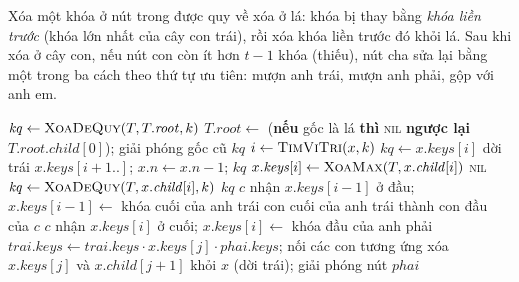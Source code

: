 Xóa một khóa ở nút trong được quy về xóa ở lá: khóa bị thay bằng \emph{khóa liền trước} (khóa lớn nhất của cây
con trái), rồi xóa khóa liền trước đó khỏi lá. Sau khi xóa ở cây con, nếu nút con còn ít hơn $t-1$ khóa (thiếu),
nút cha sửa lại bằng một trong ba cách theo thứ tự ưu tiên: mượn anh trái, mượn anh phải, gộp với anh em.

\begin{algorithm}[htbp]
\caption{Xóa mặt hàng () với mượn và gộp nút}\label{alg:xoa}
\begin{algorithmic}[1]
  \State $\mathit{kq} \gets \Call{XoaDeQuy}{T, T.\mathit{root}, k}$
   
    \State $T.\mathit{root} \gets$ (\textbf{nếu} gốc là lá \textbf{thì} \textsc{nil} \textbf{ngược lại} $T.\mathit{root}.\mathit{child}[0]$); giải phóng gốc cũ
  \EndIf
  \State \Return $\mathit{kq}$ 
\EndFunction
\Statex
{}
  \State $i \gets \Call{TimViTri}{x, k}$
    \State $\mathit{kq} \gets x.\mathit{keys}[i]$
     \State dời trái $x.\mathit{keys}[i+1..]$; $x.n \gets x.n - 1$; \Return $\mathit{kq}$ \EndIf
    \State $x.\mathit{keys}[i] \gets \Call{XoaMax}{T, x.\mathit{child}[i]}$ 
   \State \Return \textsc{nil} 
  \Else \State $\mathit{kq} \gets \Call{XoaDeQuy}{T, x.\mathit{child}[i], k}$
  \EndIf
   \State {} \EndIf
  \State \Return $\mathit{kq}$
\EndFunction
\Statex
{} 
   
    \State $c$ nhận $x.\mathit{keys}[i-1]$ ở đầu; $x.\mathit{keys}[i-1] \gets$ khóa cuối của anh trái
    \State con cuối của anh trái thành con đầu của $c$
   
    \State $c$ nhận $x.\mathit{keys}[i]$ ở cuối; $x.\mathit{keys}[i] \gets$ khóa đầu của anh phải
   \State {} \Else \State {} \EndIf
\EndProcedure
\Statex
{} 
  \State $\mathit{trai}.\mathit{keys} \gets \mathit{trai}.\mathit{keys} \cdot x.\mathit{keys}[j] \cdot \mathit{phai}.\mathit{keys}$; nối các con tương ứng
  \State xóa $x.\mathit{keys}[j]$ và $x.\mathit{child}[j+1]$ khỏi $x$ (dời trái); giải phóng nút $\mathit{phai}$
\EndProcedure
\end{algorithmic}
\end{algorithm}

